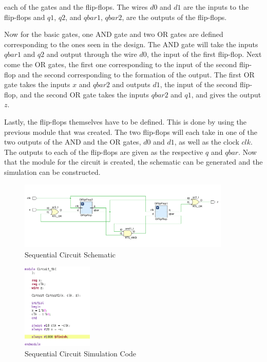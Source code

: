 \documentclass[12pt]{article}
\begin{document}
    each of the gates and the flip-flops. The wires $d 0$ and $d 1$ are the
    inputs to the flip-flops and $q 1$, $q 2$, and $qbar 1$, $qbar 2$, are the
    outputs of the flip-flops.
    \par Now for the basic gates, one AND gate and two OR gates are defined
    corresponding to the ones seen in the design. The AND gate will take the
    inputs $qbar 1$ and $q 2$ and output through the wire $d 0$, the input of
    the first flip-flop. Next come the OR gates, the first one corresponding to
    the input of the second flip-flop and the second corresponding to the
    formation of the output. The first OR gate takes the inputs $x$ and $qbar 2$
    and outputs $d 1$, the input of the second flip-flop, and the second OR gate
    takes the inputs $qbar 2$ and $q 1$, and gives the output $z$.
    \par Lastly, the flip-flops themselves have to be defined. This is done by
    using the previous module that was created. The two flip-flops will each
    take in one of the two outputs of the AND and the OR gates, $d 0$ and $d 1$,
    as well as the clock $clk$. The outputs to each of the flip-flops are given
    as the respective $q$ and $qbar$. Now that the module for the circuit is
    created, the schematic can be generated and the simulation can be
    constructed.
    \begin{figure}[h]
        \centering
        \includegraphics[width=0.9\textwidth]{Sequential Circuit Schematic.png}
        \caption{Sequential Circuit Schematic}
    \end{figure}
    \begin{figure}[h]
        \centering
        \includegraphics[width=0.3\textwidth]{Sequential Circuit Simulation Code.png}
        \caption{Sequential Circuit Simulation Code}
    \end{figure}
\end{document}
